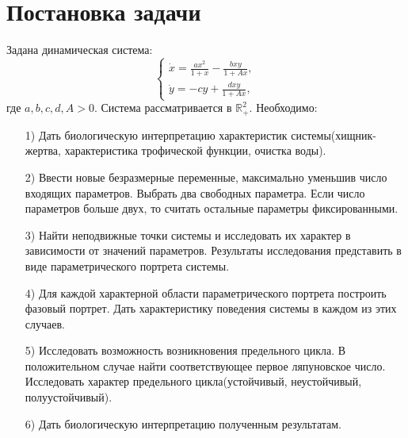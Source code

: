 \documentclass[11pt]{article}
\begin{document}
	\newpage
	\tableofcontents
	\newpage
	{\vspace*{-2cm} \hspace*{-1cm}\section{Постановка задачи}}
	{Задана динамическая система:}
	\begin{equation}
		\begin{cases}
		\dot x = \frac{ax^2}{1 + x} - \frac{bxy}{1 + Ax},\\
		\dot y = -cy + \frac{dxy}{1 + Ax},
		\end{cases}
	\end{equation}  
	{где $a,b,c,d,A > 0$. Система рассматривается в $\mathds{R}_+^2.$ Необходимо:}
	{\begin{itemize}
			\item [1)]{Дать биологическую интерпретацию характеристик системы(хищник-жертва, характеристика трофической функции, очистка воды).}
			\item [2)]{Ввести новые безразмерные переменные, максимально уменьшив число входящих параметров. Выбрать два свободных параметра. Если число параметров больше двух, то считать остальные параметры фиксированными.}
			\item [3)]{Найти неподвижные точки системы и исследовать их характер в зависимости от значений параметров. Результаты исследования представить в виде параметрического портрета системы.}
			\item [4)]{Для каждой характерной области параметрического портрета построить фазовый портрет. Дать характеристику поведения системы в каждом из этих случаев.}
			\item [5)]{Исследовать возможность возникновения предельного цикла. В положительном случае найти соответствующее первое ляпуновское число. Исследовать характер предельного цикла(устойчивый, неустойчивый, полуустойчивый).}
			\item [6)]{Дать биологическую интерпретацию полученным результатам.}
	\end{itemize}}
	
\end{document}
